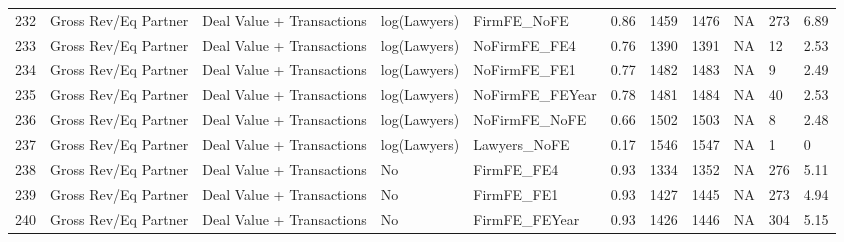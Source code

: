 \begin{table}[ht]
\begin{tabular}{rllllllllll}
  232 & Gross Rev/Eq Partner & Deal Value + Transactions & log(Lawyers) & FirmFE\_NoFE & 0.86 & 1459 & 1476 & NA & 273 & 6.89 \\ 
  233 & Gross Rev/Eq Partner & Deal Value + Transactions & log(Lawyers) & NoFirmFE\_FE4 & 0.76 & 1390 & 1391 & NA & 12 & 2.53 \\ 
  234 & Gross Rev/Eq Partner & Deal Value + Transactions & log(Lawyers) & NoFirmFE\_FE1 & 0.77 & 1482 & 1483 & NA & 9 & 2.49 \\ 
  235 & Gross Rev/Eq Partner & Deal Value + Transactions & log(Lawyers) & NoFirmFE\_FEYear & 0.78 & 1481 & 1484 & NA & 40 & 2.53 \\ 
  236 & Gross Rev/Eq Partner & Deal Value + Transactions & log(Lawyers) & NoFirmFE\_NoFE & 0.66 & 1502 & 1503 & NA & 8 & 2.48 \\ 
  237 & Gross Rev/Eq Partner & Deal Value + Transactions & log(Lawyers) & Lawyers\_NoFE & 0.17 & 1546 & 1547 & NA & 1 & 0 \\ 
  238 & Gross Rev/Eq Partner & Deal Value + Transactions & No & FirmFE\_FE4 & 0.93 & 1334 & 1352 & NA & 276 & 5.11 \\ 
  239 & Gross Rev/Eq Partner & Deal Value + Transactions & No & FirmFE\_FE1 & 0.93 & 1427 & 1445 & NA & 273 & 4.94 \\ 
  240 & Gross Rev/Eq Partner & Deal Value + Transactions & No & FirmFE\_FEYear & 0.93 & 1426 & 1446 & NA & 304 & 5.15 \\ 
   \hline
\end{tabular}
\end{table}
